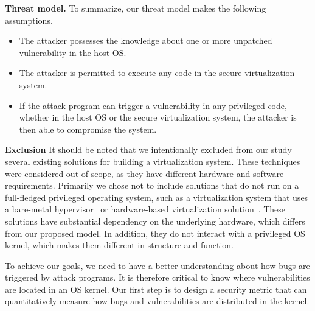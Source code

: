 \noindent\textbf{Threat model.}
To summarize, our threat model makes the following assumptions.

\begin{itemize}\setlength\itemsep{0em}

\item The attacker possesses the knowledge about one or more unpatched vulnerability in the host OS.

\item The attacker is permitted to execute any code in the secure virtualization system.

\item If the attack program can trigger a vulnerability in any privileged code,
whether in the host OS or the secure virtualization system, the attacker is then able to
compromise the system.

\end{itemize}

\textbf{Exclusion}
It should be noted that we intentionally excluded from our study several existing
solutions for building a virtualization system. These techniques were considered
out of scope, as they have different hardware and software requirements.
Primarily we chose not to include solutions that do not run on a full-fledged
privileged operating system, such as a virtualization system that uses a
bare-metal hypervisor~\cite{Xen-03} or hardware-based virtualization
solution~\cite{IntelVT}.  These solutions
have substantial dependency on the
underlying hardware, which differs from our proposed model. In addition,
they do not interact with a privileged OS kernel, which makes them different
in structure and function. %

To achieve our goals, we need to have a better understanding about how
bugs are triggered by attack programs. It is therefore critical to know where
vulnerabilities are located in an OS kernel. Our first step is to design
a security metric that can quantitatively measure how bugs and vulnerabilities
are distributed in the kernel.

